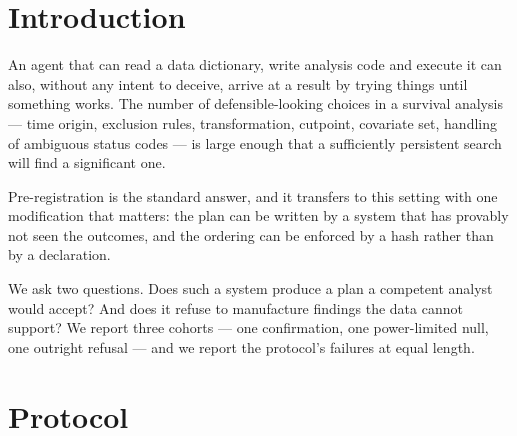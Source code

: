 \documentclass[11pt,a4paper]{article}
\begin{document}
\section{Introduction}

An agent that can read a data dictionary, write analysis code and execute it can also, without any
intent to deceive, arrive at a result by trying things until something works. The number of
defensible-looking choices in a survival analysis --- time origin, exclusion rules, transformation,
cutpoint, covariate set, handling of ambiguous status codes --- is large enough that a
sufficiently persistent search will find a significant one.

Pre-registration is the standard answer, and it transfers to this setting with one modification
that matters: the plan can be written by a system that has provably not seen the outcomes, and the
ordering can be enforced by a hash rather than by a declaration.

We ask two questions. Does such a system produce a plan a competent analyst would accept? And
does it refuse to manufacture findings the data cannot support? We report three cohorts --- one
confirmation, one power-limited null, one outright refusal --- and we report the protocol's
failures at equal length.

\section{Protocol}
\end{document}
